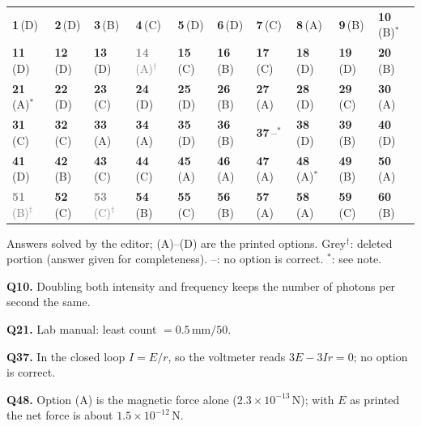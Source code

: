 {\small\setlength{\tabcolsep}{1pt}\renewcommand{\arraystretch}{1.5}
\begin{tabularx}{\linewidth}{@{}*{10}{>{\centering\arraybackslash}X}@{}}\toprule
\textbf{1}\,(D) & \textbf{2}\,(D) & \textbf{3}\,(B) & \textbf{4}\,(C) & \textbf{5}\,(D) & \textbf{6}\,(D) & \textbf{7}\,(C) & \textbf{8}\,(A) & \textbf{9}\,(B) & \textbf{10}\,(B)$^{*}$\\
\textbf{11}\,(D) & \textbf{12}\,(D) & \textbf{13}\,(D) & \textcolor{gray}{\textbf{14}\,(A)$^{\dagger}$} & \textbf{15}\,(C) & \textbf{16}\,(B) & \textbf{17}\,(C) & \textbf{18}\,(D) & \textbf{19}\,(D) & \textbf{20}\,(B)\\
\textbf{21}\,(A)$^{*}$ & \textbf{22}\,(D) & \textbf{23}\,(C) & \textbf{24}\,(D) & \textbf{25}\,(D) & \textbf{26}\,(B) & \textbf{27}\,(A) & \textbf{28}\,(D) & \textbf{29}\,(C) & \textbf{30}\,(A)\\
\textbf{31}\,(C) & \textbf{32}\,(C) & \textbf{33}\,(A) & \textbf{34}\,(A) & \textbf{35}\,(D) & \textbf{36}\,(B) & \textbf{37}\,--$^{*}$ & \textbf{38}\,(D) & \textbf{39}\,(B) & \textbf{40}\,(D)\\
\textbf{41}\,(D) & \textbf{42}\,(B) & \textbf{43}\,(C) & \textbf{44}\,(C) & \textbf{45}\,(A) & \textbf{46}\,(A) & \textbf{47}\,(A) & \textbf{48}\,(A)$^{*}$ & \textbf{49}\,(B) & \textbf{50}\,(A)\\
\textcolor{gray}{\textbf{51}\,(B)$^{\dagger}$} & \textbf{52}\,(C) & \textcolor{gray}{\textbf{53}\,(C)$^{\dagger}$} & \textbf{54}\,(B) & \textbf{55}\,(C) & \textbf{56}\,(B) & \textbf{57}\,(A) & \textbf{58}\,(A) & \textbf{59}\,(C) & \textbf{60}\,(B)\\\bottomrule\end{tabularx}}\par\smallskip
{\footnotesize Answers solved by the editor; (A)--(D) are the printed options. {\color{gray}Grey$^{\dagger}$}: deleted portion (answer given for completeness). --: no option is correct. $^{*}$: see note.\par
\par\smallskip\textbf{Q10.} Doubling both intensity and frequency keeps the number of photons per second the same.
\par\smallskip\textbf{Q21.} Lab manual: least count $= 0.5$\,mm$/50$.
\par\smallskip\textbf{Q37.} In the closed loop $I = E/r$, so the voltmeter reads $3E - 3Ir = 0$; no option is correct.
\par\smallskip\textbf{Q48.} Option (A) is the magnetic force alone ($2.3\times10^{-13}$\,N); with $E$ as printed the net force is about $1.5\times10^{-12}$\,N.
}\par

